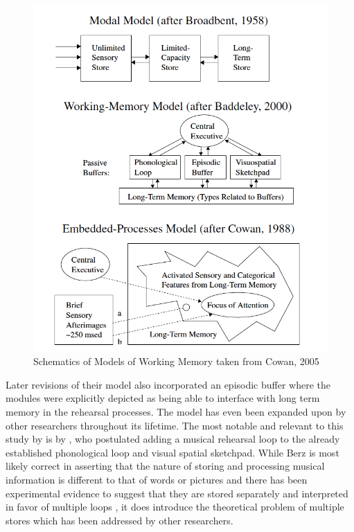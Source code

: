 \documentclass[]{book}
\theoremstyle{definition}
\theoremstyle{definition}
\theoremstyle{definition}
\theoremstyle{remark}
\begin{document}
\begin{figure}

{\centering \includegraphics[width=9.81in]{img/wm_models} 

}

\caption{Schematics of Models of Working Memory taken from Cowan, 2005}\label{fig:unnamed-chunk-1}
\end{figure}

Later revisions of their model also incorporated an episodic buffer
\citep{baddeleyEpisodicBufferNew2000} where the modules were explicitly
depicted as being able to interface with long term memory in the
rehearsal processes. The model has even been expanded upon by other
researchers throughout its lifetime. The most notable and relevant to
this study by is by \citep{berzWorkingMemoryMusic1995}, who postulated
adding a musical rehearsal loop to the already established phonological
loop and visual spatial sketchpad. While Berz is most likely correct in
asserting that the nature of storing and processing musical information
is different to that of words or pictures and there has been
experimental evidence to suggest that they are stored separately
\citep{williamsonMusiciansNonmusiciansShortterm2010} and interpreted in
favor of multiple loops \citep{wollnerAttentionalFlexibilityMemory2016}
, it does introduce the theoretical problem of multiple stores which has
been addressed by other researchers.
\end{document}
